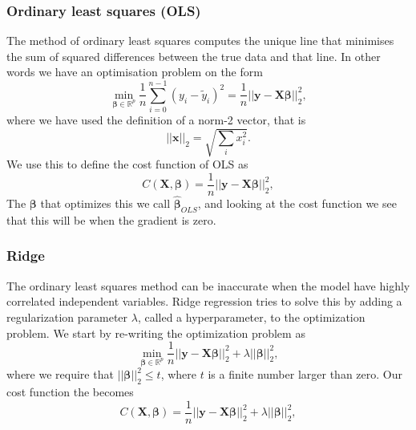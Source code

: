 \subsubsection{Ordinary least squares (OLS)}
The method of ordinary least squares computes the unique line that minimises the sum of squared differences between the true data and that line. In other words we have an optimisation problem on the form
\begin{equation*}
	{\displaystyle \min_{\boldsymbol{\beta}
	\in{\mathbb{R}}^{p}}}\frac{1}{n}\sum_{i=0}^{n-1}\left(y_i-\tilde{y}_i\right)^2
	=\frac{1}{n}\vert\vert \boldsymbol{y}-\boldsymbol{X}\boldsymbol{\beta}\vert\vert_2^2,
\end{equation*}
where we have used the definition of a norm-2 vector, that is
\begin{equation*}
	\vert\vert \boldsymbol{x}\vert\vert_2 = \sqrt{\sum_i x_i^2}.
\end{equation*}
We use this to define the cost function of OLS as
\begin{equation}
\label{eq:cost_ols}
	C(\boldsymbol{X}, \boldsymbol\beta) 
	=\frac{1}{n}\vert\vert \boldsymbol{y}-\boldsymbol{X}\boldsymbol{\beta}\vert\vert_2^2,
\end{equation}
The $\boldsymbol\beta$ that optimizes this we call $\hat{\boldsymbol\beta}_{OLS}$, and looking at the cost function we see that this will be when the gradient is zero. 

\subsubsection{Ridge}
The ordinary least squares method can be inaccurate when the model have highly correlated independent variables. Ridge regression tries to solve this by adding a regularization parameter $\lambda$, called a hyperparameter, to the optimization problem. We start by re-writing the optimization problem as 
\begin{equation*}
	{\displaystyle \min_{\boldsymbol{\beta}\in
	{\mathbb{R}}^{p}}}\frac{1}{n}\vert\vert \boldsymbol{y}
	-\boldsymbol{X}\boldsymbol{\beta}\vert\vert_2^2+\lambda\vert\vert \boldsymbol{\beta}\vert\vert_2^2,
\end{equation*}
where we require that $\vert\vert \boldsymbol{\beta}\vert\vert_2^2\le t$, where $t$ is a finite number larger than zero. Our cost function the becomes
\begin{equation}
\label{eq:cost_ridge}
	C(\boldsymbol{X},\boldsymbol{\beta}
	)=\frac{1}{n}\vert\vert \boldsymbol{y}
	-\boldsymbol{X}\boldsymbol{\beta}\vert\vert_2^2+\lambda\vert\vert \boldsymbol{\beta}\vert\vert_2^2,
\end{equation}

